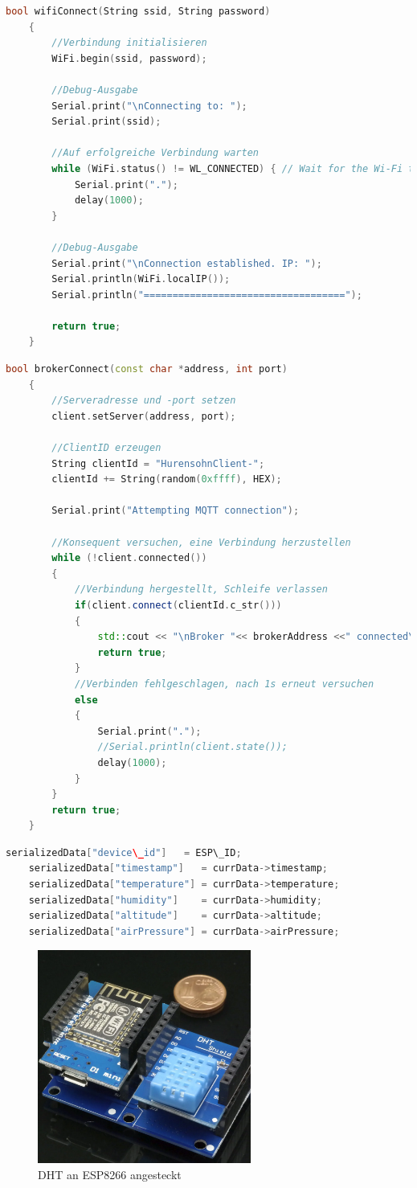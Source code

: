 \begin{lstlisting}[language=C++,caption={WiFi connect}, label=lst:wificonnect]
	bool wifiConnect(String ssid, String password)
	{
		//Verbindung initialisieren
		WiFi.begin(ssid, password);
		
		//Debug-Ausgabe
		Serial.print("\nConnecting to: ");
		Serial.print(ssid);
		
		//Auf erfolgreiche Verbindung warten
		while (WiFi.status() != WL_CONNECTED) { // Wait for the Wi-Fi to connect
			Serial.print(".");
			delay(1000);
		}
		
		//Debug-Ausgabe
		Serial.print("\nConnection established. IP: ");
		Serial.println(WiFi.localIP());
		Serial.println("===================================");
		
		return true;
	}
\end{lstlisting}

\begin{lstlisting}[language=C++,caption={MQTT Connect}, label=lst:mqttconnect]
	bool brokerConnect(const char *address, int port)
	{
		//Serveradresse und -port setzen
		client.setServer(address, port);
		
		//ClientID erzeugen
		String clientId = "HurensohnClient-";
		clientId += String(random(0xffff), HEX);
		
		Serial.print("Attempting MQTT connection");
		
		//Konsequent versuchen, eine Verbindung herzustellen
		while (!client.connected()) 
		{
			//Verbindung hergestellt, Schleife verlassen
			if(client.connect(clientId.c_str()))
			{
				std::cout << "\nBroker "<< brokerAddress <<" connected\n" << std::endl;
				return true;
			}
			//Verbinden fehlgeschlagen, nach 1s erneut versuchen
			else
			{
				Serial.print(".");
				//Serial.println(client.state());
				delay(1000);
			}
		}
		return true;
	}
\end{lstlisting}

\begin{lstlisting}[language=C++,caption={Write Json}, label=lst:writejson]
	serializedData["device\_id"]   = ESP\_ID;
	serializedData["timestamp"]   = currData->timestamp;
	serializedData["temperature"] = currData->temperature;
	serializedData["humidity"]    = currData->humidity;
	serializedData["altitude"]    = currData->altitude;
	serializedData["airPressure"] = currData->airPressure;
\end{lstlisting}

\begin{figure}[h]
	\centering
	\includegraphics[width=7cm]{images/esp_dht.png}
	\caption[dht\_an\_esp]{DHT an ESP8266 angesteckt}
	\label{fig:dht_an_esp}
\end{figure}